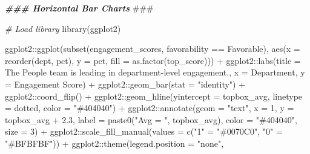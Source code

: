 \documentclass[
]{book}
\newenvironment{Shaded}{\begin{snugshade}}{\end{snugshade}}
\newcommand{\AlertTok}[1]{\textcolor[rgb]{0.94,0.16,0.16}{#1}}
\newcommand{\AttributeTok}[1]{\textcolor[rgb]{0.77,0.63,0.00}{#1}}
\newcommand{\CommentTok}[1]{\textcolor[rgb]{0.56,0.35,0.01}{\textit{#1}}}
\newcommand{\DecValTok}[1]{\textcolor[rgb]{0.00,0.00,0.81}{#1}}
\newcommand{\DocumentationTok}[1]{\textcolor[rgb]{0.56,0.35,0.01}{\textbf{\textit{#1}}}}
\newcommand{\FloatTok}[1]{\textcolor[rgb]{0.00,0.00,0.81}{#1}}
\newcommand{\FunctionTok}[1]{\textcolor[rgb]{0.00,0.00,0.00}{#1}}
\newcommand{\NormalTok}[1]{#1}
\newcommand{\OtherTok}[1]{\textcolor[rgb]{0.56,0.35,0.01}{#1}}
\newcommand{\SpecialCharTok}[1]{\textcolor[rgb]{0.00,0.00,0.00}{#1}}
\newcommand{\StringTok}[1]{\textcolor[rgb]{0.31,0.60,0.02}{#1}}
\begin{document}
\begin{Shaded}
\begin{Highlighting}[]
\DocumentationTok{\#\#\# Horizontal Bar Charts }\AlertTok{\#\#\#}

\CommentTok{\# Load library}
\FunctionTok{library}\NormalTok{(ggplot2)}

\NormalTok{ggplot2}\SpecialCharTok{::}\FunctionTok{ggplot}\NormalTok{(}\FunctionTok{subset}\NormalTok{(engagement\_scores, favorability }\SpecialCharTok{==} \StringTok{\textquotesingle{}Favorable\textquotesingle{}}\NormalTok{), }\FunctionTok{aes}\NormalTok{(}\AttributeTok{x =} \FunctionTok{reorder}\NormalTok{(dept, pct), }\AttributeTok{y =}\NormalTok{ pct, }\AttributeTok{fill =} \FunctionTok{as.factor}\NormalTok{(top\_score))) }\SpecialCharTok{+}
\NormalTok{ggplot2}\SpecialCharTok{::}\FunctionTok{labs}\NormalTok{(}\AttributeTok{title =} \StringTok{\textquotesingle{}The People team is leading in department{-}level engagement.\textquotesingle{}}\NormalTok{, }\AttributeTok{x =} \StringTok{\textquotesingle{}Department\textquotesingle{}}\NormalTok{, }\AttributeTok{y =} \StringTok{\textquotesingle{}Engagement Score\textquotesingle{}}\NormalTok{) }\SpecialCharTok{+}
\NormalTok{ggplot2}\SpecialCharTok{::}\FunctionTok{geom\_bar}\NormalTok{(}\AttributeTok{stat =} \StringTok{"identity"}\NormalTok{) }\SpecialCharTok{+}
\NormalTok{ggplot2}\SpecialCharTok{::}\FunctionTok{coord\_flip}\NormalTok{() }\SpecialCharTok{+}
\NormalTok{ggplot2}\SpecialCharTok{::}\FunctionTok{geom\_hline}\NormalTok{(}\AttributeTok{yintercept =}\NormalTok{ topbox\_avg, }\AttributeTok{linetype =} \StringTok{\textquotesingle{}dotted\textquotesingle{}}\NormalTok{, }\AttributeTok{color =} \StringTok{"\#404040"}\NormalTok{) }\SpecialCharTok{+} 
\NormalTok{ggplot2}\SpecialCharTok{::}\FunctionTok{annotate}\NormalTok{(}\AttributeTok{geom =} \StringTok{"text"}\NormalTok{, }\AttributeTok{x =} \DecValTok{1}\NormalTok{, }\AttributeTok{y =}\NormalTok{ topbox\_avg }\SpecialCharTok{+} \FloatTok{2.3}\NormalTok{, }\AttributeTok{label =} \FunctionTok{paste0}\NormalTok{(}\StringTok{"Avg = "}\NormalTok{, topbox\_avg), }\AttributeTok{color =} \StringTok{"\#404040"}\NormalTok{, }\AttributeTok{size =} \DecValTok{3}\NormalTok{) }\SpecialCharTok{+}
\NormalTok{ggplot2}\SpecialCharTok{::}\FunctionTok{scale\_fill\_manual}\NormalTok{(}\AttributeTok{values =} \FunctionTok{c}\NormalTok{(}\StringTok{"1"} \OtherTok{=} \StringTok{"\#0070C0"}\NormalTok{,}
                                      \StringTok{"0"} \OtherTok{=} \StringTok{"\#BFBFBF"}\NormalTok{)) }\SpecialCharTok{+}
\NormalTok{ggplot2}\SpecialCharTok{::}\FunctionTok{theme}\NormalTok{(}\AttributeTok{legend.position =} \StringTok{"none"}\NormalTok{,}

\end{Highlighting}
\end{Shaded}
\end{document}
